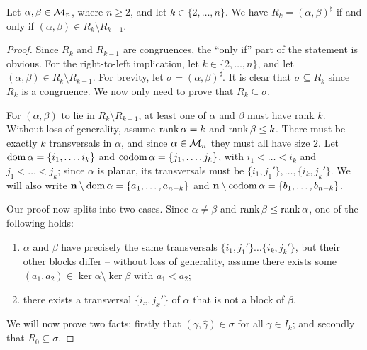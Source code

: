 \begin{lemma}
  \label{lem:rees-genpairs}
  Let $\alpha,\beta \in \mathcal{M}_n$, where $n \geq 2$, and let $k \in \{2, \ldots, n\}$.  We have
  $R_k = (\alpha, \beta)^\sharp$ if and only if
  $(\alpha, \beta) \in R_k \setminus R_{k-1}$.
  \begin{proof}
    Since $R_k$ and $R_{k-1}$ are congruences, the ``only if'' part of the
    statement is obvious.  For the right-to-left implication, let
    $k \in \{2, \ldots, n\}$, and let
    $(\alpha, \beta) \in R_k \setminus R_{k-1}$.  For brevity, let
    $\sigma = (\alpha, \beta)^\sharp$.  It is clear that $\sigma \subseteq R_k$
    since $R_k$ is a congruence.  We now only need to prove that
    $R_k \subseteq \sigma$.

    For $(\alpha, \beta)$ to lie in $R_k \setminus R_{k-1}$, at least one of
    $\alpha$ and $\beta$ must have rank $k$.  Without loss of generality, assume
    $\operatorname{rank}\alpha = k$ and $\operatorname{rank}\beta \leq k$.  There must be exactly $k$
    transversals in $\alpha$, and since $\alpha \in \mathcal{M}_n$ they must all have
    size $2$.  Let $\operatorname{dom}\alpha = \{i_1, \ldots, i_k\}$ and
    $\operatorname{codom}\alpha = \{j_1, \ldots, j_k\}$, with $i_1 < \ldots < i_k$ and
    $j_1 < \ldots < j_k$; since $\alpha$ is planar, its transversals must be
    $\{i_1, j_1'\}, \ldots, \{i_k, j_k'\}$.  We will also write
    $\mathbf{n} \setminus \operatorname{dom}\alpha = \{a_1, \ldots, a_{n-k}\}$ and
    $\mathbf{n} \setminus \operatorname{codom}\alpha = \{b_1, \ldots, b_{n-k}\}$.

    Our proof now splits into two cases.  Since $\alpha \neq \beta$ and
    $\operatorname{rank}\beta \leq \operatorname{rank}\alpha$, one of the following holds:
    \begin{enumerate}[\rm(a)]
    \item $\alpha$ and $\beta$ have precisely the same transversals
      $\{i_1, j_1'\} \ldots \{i_k, j_k'\}$, but their other blocks
      differ -- without loss of generality, assume there exists some
      $(a_1,a_2) \in \ker\alpha \setminus \ker\beta$ with $a_1 < a_2$;
    \item there exists a transversal $\{i_x,j_x'\}$ of $\alpha$ that is not a
      block of $\beta$.
    \end{enumerate}
    We will now prove two facts: firstly that
    $(\gamma, \widehat\gamma) \in \sigma$ for all $\gamma \in I_k$; and secondly
    that $R_0 \subseteq \sigma$.


\end{proof}
\end{lemma}
